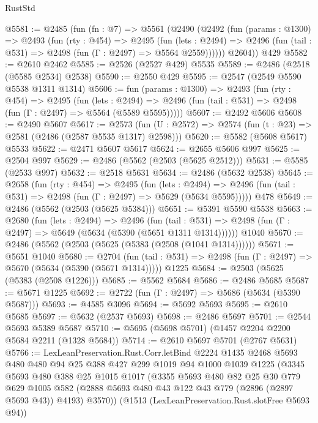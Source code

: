 \begin{lexlean}{RustStd}
\begin{coremodule}
@5581 := @2485
    (fun (fn : @7) =>
    @5561
      (@2490
        (@2492
          (fun (params : @1300) =>
          @2493
            (fun (rty : @454) =>
            @2495
              (fun (lets : @2494) =>
              @2496 (fun (tail : @531) => @2498 (fun (Γ : @2497) => @5564 @2559))))))
        @2604))
    @429
@5582 := @2610 @2462
@5585 := @2526 (@2527 @429) @5535
@5589 := @2486 (@2518 (@5585 @2534) @2538)
@5590 := @2550 @429
@5595 := @2547 (@2549 @5590 @5538 @1311 @1314)
@5606 := fun (params : @1300) =>
  @2493
    (fun (rty : @454) =>
    @2495
      (fun (lets : @2494) =>
      @2496 (fun (tail : @531) => @2498 (fun (Γ : @2497) => @5564 (@5589 @5595)))))
@5607 := @2492 @5606
@5608 := @2490 @5607
@5617 := @2573 (fun (U : @2572) => @2574 (fun (t : @23) => @2581 (@2486 (@2587 @5535 @1317) @2598)))
@5620 := @5582 (@5608 @5617) @5533
@5622 := @2471 @5607 @5617
@5624 := @2655 @5606 @997
@5625 := @2504 @997
@5629 := @2486 (@5562 (@2503 (@5625 @2512)))
@5631 := @5585 (@2533 @997)
@5632 := @2518 @5631
@5634 := @2486 (@5632 @2538)
@5645 := @2658
    (fun (rty : @454) =>
    @2495
      (fun (lets : @2494) =>
      @2496 (fun (tail : @531) => @2498 (fun (Γ : @2497) => @5629 (@5634 @5595)))))
    @478
@5649 := @2486 (@5562 (@2503 (@5625 @5384)))
@5651 := @5391 @5590 @5538
@5663 := @2680
    (fun (lets : @2494) =>
    @2496
      (fun (tail : @531) => @2498 (fun (Γ : @2497) => @5649 (@5634 (@5390 (@5651 @1311 @1314))))))
    @1040
@5670 := @2486 (@5562 (@2503 (@5625 (@5383 (@2508 (@1041 @1314))))))
@5671 := @5651 @1040
@5680 := @2704
    (fun (tail : @531) => @2498 (fun (Γ : @2497) => @5670 (@5634 (@5390 (@5671 @1314)))))
    @1225
@5684 := @2503 (@5625 (@5383 (@2508 @1226)))
@5685 := @5562 @5684
@5686 := @2486 @5685
@5687 := @5671 @1225
@5692 := @2722 (fun (Γ : @2497) => @5686 (@5634 (@5390 @5687)))
@5693 := @4585 @3096
@5694 := @5692 @5693
@5695 := @2610 @5685
@5697 := @5632 (@2537 @5693)
@5698 := @2486 @5697
@5701 := @2544 @5693 @5389 @5687
@5710 := @5695 (@5698 @5701) (@1457 @2204 @2200 @5684 @2211 (@1328 @5684))
@5714 := @2610 @5697 @5701 (@2767 @5631)
@5766 := LexLeanPreservation.Rust.Corr.letBind
    @2224
    @1435
    @2468
    @5693
    @480
    @480
    @94
    @25
    @388
    @427
    @299
    @1019
    @94
    @1000
    @1039
    @1225
    (@3345
      @5693
      @480
      @388
      @25
      @1015
      @1017
      (@3355
        @5693
        @480
        @82
        @25
        @30
        @779
        @629
        @1005
        @582
        (@2888 @5693 @480 @43 @122 @43 @779 (@2896 (@2897 @5693 @43)) @4193)
        @3570))
    (@1513 (LexLeanPreservation.Rust.slotFree @5693 @94))

\end{coremodule}
\end{lexlean}
